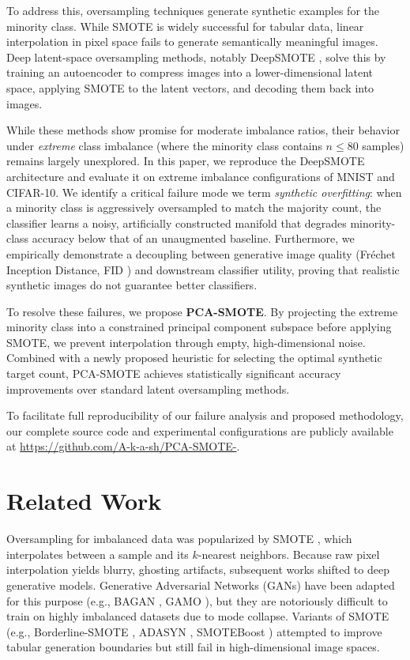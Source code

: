 \documentclass[5p,times]{elsarticle}
\begin{document}
To address this, oversampling techniques generate synthetic examples for the minority class. While SMOTE \citep{chawla2002smote} is widely successful for tabular data, linear interpolation in pixel space fails to generate semantically meaningful images. Deep latent-space oversampling methods, notably DeepSMOTE \citep{dablain2022deepsmote}, solve this by training an autoencoder to compress images into a lower-dimensional latent space, applying SMOTE to the latent vectors, and decoding them back into images. 

While these methods show promise for moderate imbalance ratios, their behavior under \emph{extreme} class imbalance (where the minority class contains $n \le 80$ samples) remains largely unexplored. In this paper, we reproduce the DeepSMOTE architecture and evaluate it on extreme imbalance configurations of MNIST and CIFAR-10. We identify a critical failure mode we term \emph{synthetic overfitting}: when a minority class is aggressively oversampled to match the majority count, the classifier learns a noisy, artificially constructed manifold that degrades minority-class accuracy below that of an unaugmented baseline. Furthermore, we empirically demonstrate a decoupling between generative image quality (Fr\'{e}chet Inception Distance, FID \citep{heusel2017gans}) and downstream classifier utility, proving that realistic synthetic images do not guarantee better classifiers.

To resolve these failures, we propose \textbf{PCA-SMOTE}. By projecting the extreme minority class into a constrained principal component subspace before applying SMOTE, we prevent interpolation through empty, high-dimensional noise. Combined with a newly proposed heuristic for selecting the optimal synthetic target count, PCA-SMOTE achieves statistically significant accuracy improvements over standard latent oversampling methods.

To facilitate full reproducibility of our failure analysis and proposed methodology, our complete source code and experimental configurations are publicly available at \url{https://github.com/A-k-a-sh/PCA-SMOTE-}.

\section{Related Work}
\label{sec:related}
Oversampling for imbalanced data was popularized by SMOTE \citep{chawla2002smote}, which interpolates between a sample and its $k$-nearest neighbors. Because raw pixel interpolation yields blurry, ghosting artifacts, subsequent works shifted to deep generative models. Generative Adversarial Networks (GANs) have been adapted for this purpose (e.g., BAGAN \citep{mariani2018bagan}, GAMO \citep{mullick2019gamo}), but they are notoriously difficult to train on highly imbalanced datasets due to mode collapse. Variants of SMOTE (e.g., Borderline-SMOTE \citep{han2005borderline}, ADASYN \citep{he2008adasyn}, SMOTEBoost \citep{chawla2003smoteboost}) attempted to improve tabular generation boundaries but still fail in high-dimensional image spaces.
\end{document}
